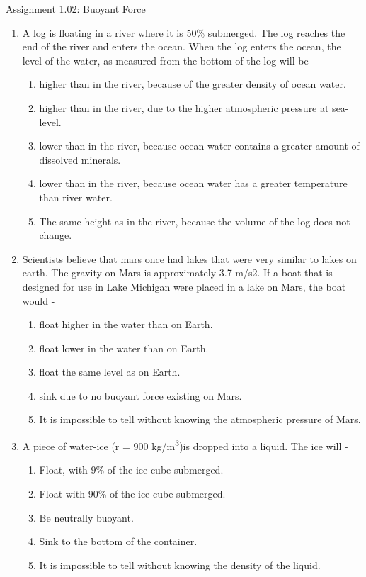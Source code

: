 \documentclass[letterpaper, 11pt]{article}
\begin{document}
	

	
\begin{center}Assignment 1.02: Buoyant Force
\end{center}

\begin{enumerate}




	\item A log is floating in a river where it is 50\% submerged.  The log reaches the end of the river and enters the ocean.  When the log enters the ocean, the level of the water, as measured from the bottom of the log will be
	\begin{enumerate}
		\item higher than in the river, because of the greater density of ocean water.
		\item higher than in the river, due to the higher atmospheric pressure at sea-level.
		\item lower than in the river, because ocean water contains a greater amount of dissolved minerals.
		\item lower than in the river, because ocean water has a greater temperature than river water.
		\item The same height as in the river, because the volume of the log does not change.
	\end{enumerate}
 
	\item Scientists believe that mars once had lakes that were very similar to lakes on earth.  The gravity on Mars is approximately 3.7 m/s2.  If a boat that is designed for use in Lake Michigan were placed in a lake on Mars, the boat would - 
	\begin{enumerate}
		\item float higher in the water than on Earth.
		\item float lower in the water than on Earth.
		\item float the same level as on Earth.
		\item sink due to no buoyant force existing on Mars.
		\item It is impossible to tell without knowing the atmospheric pressure of Mars.
	\end{enumerate}
	\item A piece of water-ice (r = 900 kg/m\textsuperscript{3})is dropped into a liquid.  The ice will - 
	\begin{enumerate}
		\item Float, with 9\% of the ice cube submerged.
		\item Float with 90\% of the ice cube submerged.
		\item Be neutrally buoyant.
		\item Sink to the bottom of the container.
		\item It is impossible to tell without knowing the density of the liquid.
	\end{enumerate}


\end{enumerate}
\end{document}
